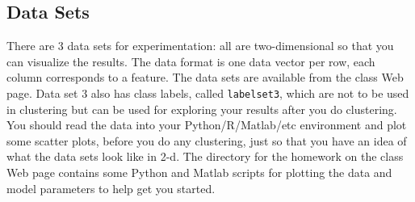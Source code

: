 \documentclass[11pt]{article}
\begin{document}
\subsection*{Data Sets} There are 3 data sets for
experimentation: all are two-dimensional so that you can
visualize the results. The data format is one data vector per row, each column
corresponds to a feature. The data sets are available from the class Web page.
Data set 3 also has class labels, called {\tt labelset3},
 which are not to be used in clustering but can be used for exploring
your results after you do clustering.  You should
 read the data into your Python/R/Matlab/etc environment and plot some scatter
plots, before you do any clustering, just so that you have an idea of what the data sets look 
like in 2-d. The directory for the homework on
the class Web page contains some Python and Matlab scripts for plotting the data and model
parameters to help get you started.
\end{document}

